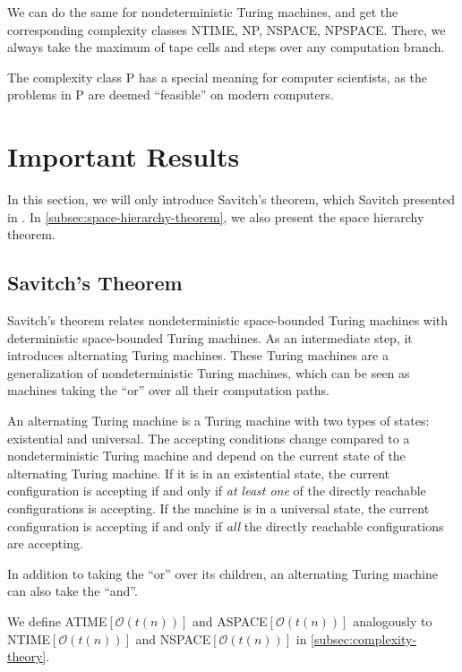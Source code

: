 We can do the same for nondeterministic Turing machines, and get the corresponding complexity classes NTIME, NP, NSPACE, NPSPACE\@.
There, we always take the maximum of tape cells and steps over any computation branch.

The complexity class P has a special meaning for computer scientists, as the problems in P are deemed ``feasible'' on modern computers.


\section{Important Results}\label{sec:important-results}

In this section, we will only introduce Savitch's theorem, which Savitch presented in \cite{Savitch1970}.
In \cref{subsec:space-hierarchy-theorem}, we also present the space hierarchy theorem.

\subsection{Savitch's Theorem}\label{subsec:nspacesubsetdspacesquared}

Savitch's theorem relates nondeterministic space-bounded Turing machines with deterministic space-bounded Turing machines.
As an intermediate step, it introduces alternating Turing machines.
These Turing machines are a generalization of nondeterministic Turing machines, which can be seen as machines taking the ``or'' over all their computation paths.

\begin{define}
    An alternating Turing machine is a Turing machine with two types of states: existential and universal.
    The accepting conditions change compared to a nondeterministic Turing machine and depend on the current state of the alternating Turing machine.
    If it is in an existential state, the current configuration is accepting if and only if \emph{at least one} of the directly reachable configurations is accepting.
    If the machine is in a universal state, the current configuration is accepting if and only if \emph{all} the directly reachable configurations are accepting.
\end{define}

In addition to taking the ``or'' over its children, an alternating Turing machine can also take the ``and''.

\sloppy We define ATIME$[\mathcal{O}(t(n))]$ and ASPACE$[\mathcal{O}(t(n))]$ analogously to NTIME$[\mathcal{O}(t(n))]$ and NSPACE$[\mathcal{O}(t(n))]$ in \cref{subsec:complexity-theory}.

